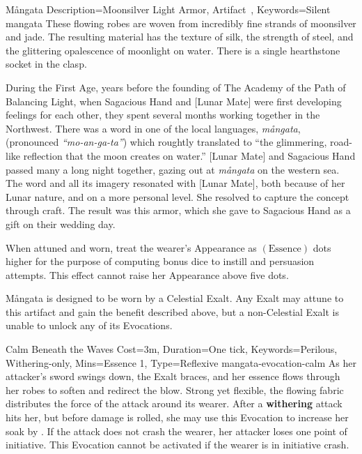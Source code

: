 ﻿

\begin{Merit}{Mångata}{
    Description={Moonsilver Light Armor, Artifact~},
    Keywords=Silent
}{mangata}
These flowing robes are woven from incredibly fine strands of moonsilver and
jade. The resulting material has the texture of silk, the strength of steel,
and the glittering opalescence of moonlight on water. There is a single
hearthstone socket in the clasp.

During the First Age, years before the founding of The Academy of the Path of
Balancing Light, when Sagacious Hand and [Lunar Mate] were first developing
feelings for each other, they spent several months working together in the
Northwest. There was a word in one of the local languages, \textit{mångata},
(pronounced \textit{``mo-an-ga-ta''}) which roughtly translated to ``the
glimmering, road-like reflection that the moon creates on water.'' [Lunar Mate]
and Sagacious Hand passed many a long night together, gazing out at
\textit{mångata} on the western sea. The word and all its imagery resonated
with [Lunar Mate], both because of her Lunar nature, and on a more personal
level. She resolved to capture the concept through craft. The result was this
armor, which she gave to Sagacious Hand as a gift on their wedding day.


When attuned and worn, treat the wearer's Appearance as $(\mathrm{Essence})$
dots higher for the purpose of computing bonus dice to instill and persuasion
attempts. This effect cannot raise her Appearance above five dots.

Mångata is designed to be worn by a Celestial Exalt. Any Exalt may attune to
this artifact and gain the benefit described above, but a non-Celestial Exalt
is unable to unlock any of its Evocations.

\begin{Charm}{Calm Beneath the Waves}{
    Cost=3m,
    Duration=One tick,
    Keywords={Perilous, Withering-only},
    Mins=Essence 1,
    Type=Reflexive
}{mangata-evocation-calm}
    As her attacker's sword swings down, the Exalt braces, and her essence
    flows through her robes to soften and redirect the blow. Strong yet
    flexible, the flowing fabric distributes the force of the attack around its
    wearer. After a \textbf{withering} attack hits her, but before damage is
    rolled, she may use this Evocation to increase her soak by
    . If the attack does not crash the wearer, her attacker
    loses one point of initiative. This Evocation cannot be activated if the
    wearer is in initiative crash.
\end{Charm}


\end{Merit}
